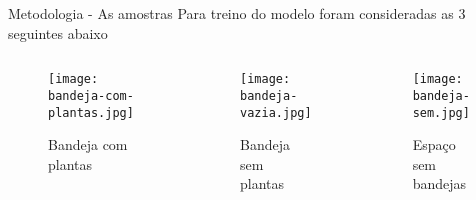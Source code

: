 \begin{frame}[t]{Metodologia - As amostras}
    Para treino do modelo foram consideradas as 3 seguintes abaixo
    \begin{columns}[t]
        \begin{center}
                \begin{figure}
                    \texttt{[image: bandeja-com-plantas.jpg]}
                    \caption{Bandeja com plantas}
                \end{figure}
        \end{center}

        \begin{center}
                \begin{figure}
                    \texttt{[image: bandeja-vazia.jpg]}
                    \caption{Bandeja sem plantas}
                \end{figure}
        \end{center}

        \begin{center}
                \begin{figure}
                    \texttt{[image: bandeja-sem.jpg]}
                    \caption{Espaço sem bandejas}
                \end{figure}
        \end{center}
    \end{columns}
\end{frame}


